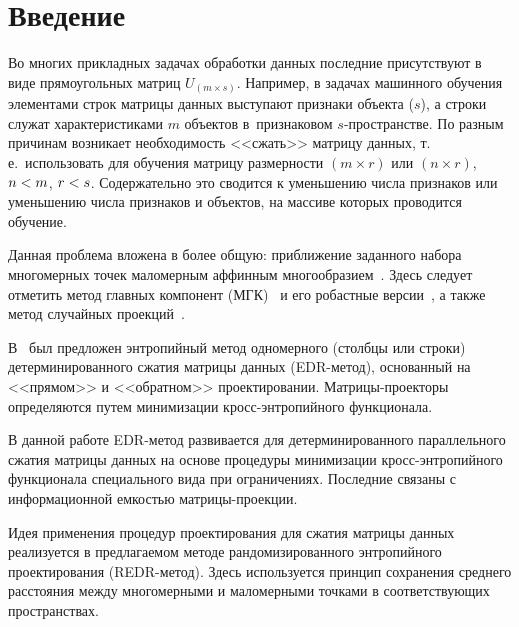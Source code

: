 

  



\thispagestyle{headings}

\begin{multicols}{2}

\label{st\stat}

\section{Введение}

Во многих прикладных задачах обработки данных последние присутствуют в виде 
прямоугольных матриц $U_{(m \times s)}$. Например, в задачах машинного
обучения элементами строк матрицы данных выступают признаки объекта ($s$), а 
строки служат характеристиками $m$ объектов в~признаковом \mbox{$s$-про}\-стран\-ст\-ве. 
По разным причинам возникает \mbox{необходимость} <<сжать>> матрицу данных, 
т.\,е.\ использовать для обучения матрицу размерности $(m \times r)$ или $(n 
\times r)$, $n\hm < m$, $r \hm< s$. Содержательно это сводится к уменьшению 
числа признаков или уменьшению числа признаков и объектов, на массиве которых 
проводится обучение.

Данная проблема вложена в более общую: приближение заданного набора 
многомерных точек маломерным аффинным многообразием~\cite{Bruckstein_2009}. 
Здесь следует отметить метод главных компонент 
(МГК)~\cite{Kendall_1973, Jolliffe_2011} и его робастные 
версии~\cite{Polyak_2017}, а также метод случайных 
проекций~\cite{Bingham_2001, Vempala_2005}.

В~\cite{Popkov_2018_at_a_en} был предложен энтропийный метод одномерного 
(столбцы или строки) детерминированного сжатия матрицы данных (EDR-ме\-тод), 
основанный на <<прямом>> и <<обратном>> проектировании. 
Мат\-ри\-цы-про\-ек\-то\-ры определяются путем минимизации кросс-эн\-тро\-пий\-но\-го функционала.

В данной работе EDR-метод развивается для детерминированного параллельного 
сжатия матрицы данных на основе процедуры минимизации  кросс-эн\-тро\-пий\-но\-го 
функционала специального вида при ограничениях. Последние связаны с 
информационной емкостью мат\-ри\-цы-про\-ек\-ции.

Идея применения процедур проектирования для сжатия матрицы данных реализуется 
в предлагаемом методе рандомизированного энтропийного проектирования (REDR-ме\-тод). 
Здесь используется принцип сохранения среднего расстояния между 
многомерными и маломерными точками в соответствующих пространствах.



\end{multicols}

